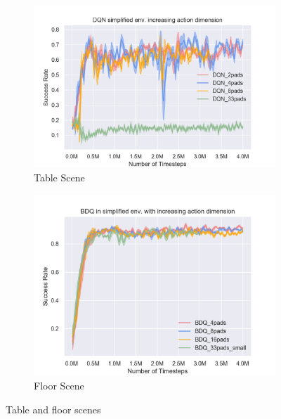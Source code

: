 \begin{figure}[!htbp]
    \begin{subfigure}{0.49\textwidth}
        \includegraphics[width=\linewidth]{figures/DQN_simplified_env_increasing_action_dimension}
        \caption{Table Scene} \label{fig:table}
    \end{subfigure}%
    \hspace*{\fill}   %
    \begin{subfigure}{0.49\textwidth}
        \includegraphics[width=\linewidth]{figures/BDQ_in_simplified_env_with_increasing_action_dimension}
        \caption{Floor Scene} \label{fig:floor}
    \end{subfigure}%
    \hspace*{\fill}   %


\caption{ Table and floor scenes \label{fig:scenes}}
\end{figure}



